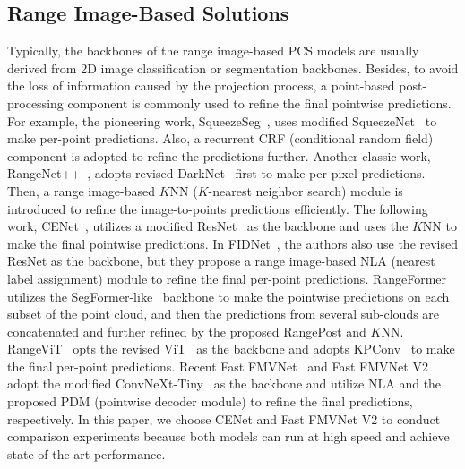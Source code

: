 \subsection{Range Image-Based Solutions}
Typically, the backbones of the range image-based PCS models are usually derived from 2D image classification or segmentation backbones. Besides, to avoid the loss of information caused by the projection process, a point-based post-processing component is commonly used to refine the final pointwise predictions. For example, the pioneering work, SqueezeSeg~\cite{squeezeseg}, uses modified SqueezeNet~\cite{squeezenet_2016} to make per-point predictions. Also, a recurrent CRF (conditional random field) component is adopted to refine the predictions further. Another classic work, RangeNet++~\cite{rangenet++}, adopts revised DarkNet~\cite{yolov3_2018} first to make per-pixel predictions. Then, a range image-based $K$NN ($K$-nearest neighbor search) module is introduced to refine the image-to-points predictions efficiently. The following work, CENet~\cite{cenet_2022}, utilizes a modified ResNet~\cite{resnet_2016} as the backbone and uses the $K$NN to make the final pointwise predictions. In FIDNet~\cite{fidnet_2021}, the authors also use the revised ResNet as the backbone, but they propose a range image-based NLA (nearest label assignment) module to refine the final per-point predictions. RangeFormer~\cite{rangeformer_2023} utilizes the SegFormer-like~\cite{segformer2021} backbone to make the pointwise predictions on each subset of the point cloud, and then the predictions from several sub-clouds are concatenated and further refined by the proposed RangePost and $K$NN. RangeViT~\cite{rangevit_2023} opts the revised ViT~\cite{vit_iclr_2021} as the backbone and adopts KPConv~\cite{kpconv_2019} to make the final per-point predictions. Recent Fast FMVNet~\cite{filling_missing2024} and Fast FMVNet V2~\cite{pdm2024} adopt the modified ConvNeXt-Tiny~\cite{convnext2022} as the backbone and utilize NLA and the proposed PDM (pointwise decoder module) to refine the final predictions, respectively. In this paper, we choose CENet and Fast FMVNet V2 to conduct comparison experiments because both models can run at high speed and achieve state-of-the-art performance.
   

